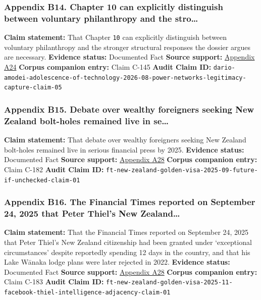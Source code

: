 \documentclass[
  american,
  11pt,
  letterpaper,
]{article}
\begin{document}
\subsubsection{Appendix B14. Chapter 10 can explicitly distinguish
between voluntary philanthropy and the
stro\ldots{}}\label{appendix-b14-chapter-10-can-explicitly-distinguish-between-voluntary-philanthropy-and-the-stro}

\textbf{Claim statement:} That Chapter \texttt{10} can explicitly
distinguish between voluntary philanthropy and the stronger structural
responses the dossier argues are necessary. \textbf{Evidence status:}
Documented Fact \textbf{Source support:}
\hyperref[appendix-a24-the-adolescence-of-technology]{Appendix A24}
\textbf{Corpus companion entry:} Claim C-145 \textbf{Audit Claim ID:}
\texttt{dario-amodei-adolescence-of-technology-2026-08-power-networks-legitimacy-capture-claim-05}

\subsubsection{Appendix B15. Debate over wealthy foreigners seeking New
Zealand bolt-holes remained live in
se\ldots{}}\label{appendix-b15-debate-over-wealthy-foreigners-seeking-new-zealand-bolt-holes-remained-live-in-se}

\textbf{Claim statement:} That debate over wealthy foreigners seeking
New Zealand bolt-holes remained live in serious financial press by 2025.
\textbf{Evidence status:} Documented Fact \textbf{Source support:}
\hyperref[appendix-a28-new-zealand-woos-the-wealthy-with-golden-visa-changes]{Appendix
A28} \textbf{Corpus companion entry:} Claim C-182 \textbf{Audit Claim
ID:}
\texttt{ft-new-zealand-golden-visa-2025-09-future-if-unchecked-claim-01}

\subsubsection{Appendix B16. The Financial Times reported on September
24, 2025 that Peter Thiel's New
Zealand\ldots{}}\label{appendix-b16-the-financial-times-reported-on-september-24-2025-that-peter-thiel-s-new-zealand}

\textbf{Claim statement:} That the Financial Times reported on September
24, 2025 that Peter Thiel's New Zealand citizenship had been granted
under `exceptional circumstances' despite reportedly spending 12 days in
the country, and that his Lake Wānaka lodge plans were later rejected in
2022. \textbf{Evidence status:} Documented Fact \textbf{Source support:}
\hyperref[appendix-a28-new-zealand-woos-the-wealthy-with-golden-visa-changes]{Appendix
A28} \textbf{Corpus companion entry:} Claim C-183 \textbf{Audit Claim
ID:}
\texttt{ft-new-zealand-golden-visa-2025-11-facebook-thiel-intelligence-adjacency-claim-01}
\end{document}
